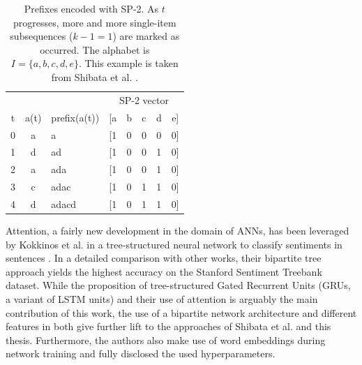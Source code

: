 \begin{table}
    \centering
    \begin{tabular}{cclccccc}
        \hline
          &      &              & \multicolumn{5}{c}{SP-2 vector}\\
        t & a(t) & prefix(a(t)) & [a & b & c & d & e]\\
        \hline
        0 & a    & a            & [1 & 0 & 0 & 0 & 0]\\
        1 & d    & ad           & [1 & 0 & 0 & 1 & 0]\\
        2 & a    & ada          & [1 & 0 & 0 & 1 & 0]\\
        3 & c    & adac         & [1 & 0 & 1 & 1 & 0]\\
        4 & d    & adacd        & [1 & 0 & 1 & 1 & 0]\\
        \hline
    \end{tabular}
    \caption{Prefixes encoded with SP-2. As $t$ progresses, more and more single-item subsequences ($k-1=1$) are marked as occurred. The alphabet is $I=\{a,b,c,d,e\}$. This example is taken from Shibata et al.  \cite{shibata2016bipartite}.}
    \label{tab:sp2-encoding}
\end{table}

Attention, a fairly new development in the domain of ANNs, has been leveraged by Kokkinos et al. in a tree-structured neural network to classify sentiments in sentences \cite{kokkinos2017structural}. In a detailed comparison with other works, their bipartite tree approach yields the highest accuracy on the Stanford Sentiment Treebank dataset. While the proposition of tree-structured Gated Recurrent Units (GRUs, a variant of LSTM units) and their use of attention is arguably the main contribution of this work, the use of a bipartite network architecture and different features in both give further lift to the approaches of Shibata et al. and this thesis. Furthermore, the authors also make use of word embeddings during network training and fully disclosed the used hyperparameters.